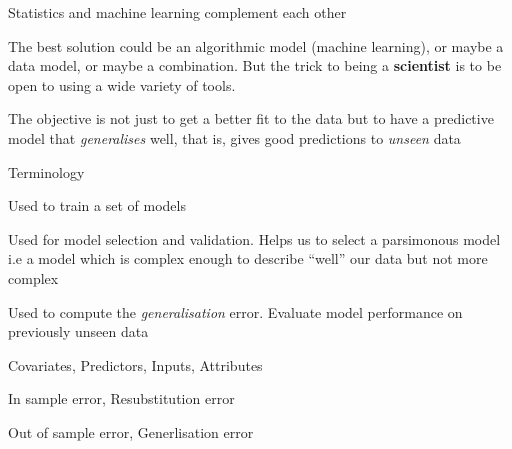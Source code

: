 \documentclass[pdf]{beamer}
\begin{document}
\begin{frame}{Statistics and machine learning complement each other}
\begin{exampleblock}{}
{\small The best solution could be an algorithmic model (machine learning), or maybe a data model, or maybe a combination. But the trick to being a \textbf{scientist} is to be open to using a wide variety of tools.}
\vskip5mm
\hspace*{}
\end{exampleblock}
\vfill
\vfill
\begin{exampleblock}{}
The objective is not just to get a better fit to the data but to have a predictive model that \textit{generalises} well, that is, gives good predictions to \textit{unseen} data 
\end{exampleblock}
\end{frame}

\begin{frame}{Terminology}
\begin{description}\addtolength{\itemsep}{0.5\baselineskip}
	\item<2->[Training Dataset:] Used to train a set of models
	\item<3->[Validation Dataset:] Used for model selection and validation. Helps us to select a 
	parsimonous model i.e a model which is complex enough to describe ``well'' our data but not more 
	complex
	\item<4->[Testing Dataset:] Used to compute the \textit{generalisation} error. Evaluate model
	performance on previously unseen data 
	\item<5->[Features:] Covariates, Predictors, Inputs, Attributes
	\item<6->[Training error:] In sample error, Resubstitution error
	\item<7->[Testing error:] Out of sample error, Generlisation error
\end{description}
\end{frame}
\end{document}
